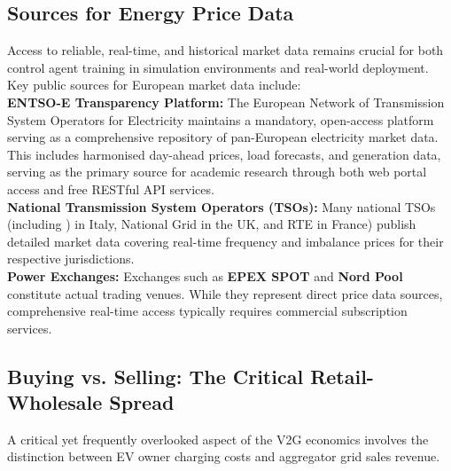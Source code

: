 \subsection{Sources for Energy Price Data}

Access to reliable, real-time, and historical market data remains crucial for both control agent training in simulation environments and real-world deployment. Key public sources for European market data include:
\\
\noindent
 \textbf{ENTSO-E Transparency Platform:} The European Network of Transmission System Operators for Electricity maintains a mandatory, open-access platform serving as a comprehensive repository of pan-European electricity market data. This includes harmonised day-ahead prices, load forecasts, and generation data, serving as the primary source for academic research through both web portal access and free RESTful API services.
\\
\noindent
\textbf{National Transmission System Operators (TSOs):} Many national TSOs (including  ) in Italy, National Grid in the UK, and RTE in France) publish detailed market data covering real-time frequency and imbalance prices for their respective jurisdictions.
    \\
\noindent
     \textbf{Power Exchanges:} Exchanges such as \textbf{EPEX SPOT} and \textbf{Nord Pool} constitute actual trading venues. While they represent direct price data sources, comprehensive real-time access typically requires commercial subscription services.


\subsection{Buying vs. Selling: The Critical Retail-Wholesale Spread}
\noindent
A critical yet frequently overlooked aspect of the V2G economics involves the distinction between EV owner charging costs and aggregator grid sales revenue.

